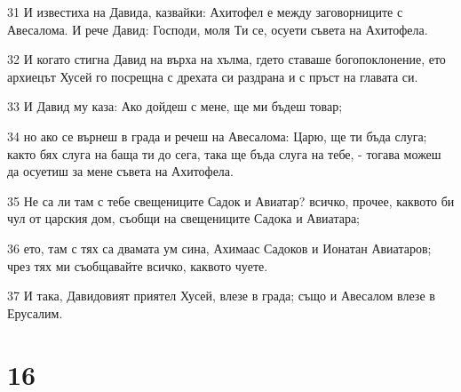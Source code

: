 \par 31 И известиха на Давида, казвайки: Ахитофел е между заговорниците с Авесалома. И рече Давид: Господи, моля Ти се, осуети съвета на Ахитофела.
\par 32 И когато стигна Давид на върха на хълма, гдето ставаше богопоклонение, ето архиецът Хусей го посрещна с дрехата си раздрана и с пръст на главата си.
\par 33 И Давид му каза: Ако дойдеш с мене, ще ми бъдеш товар;
\par 34 но ако се върнеш в града и речеш на Авесалома: Царю, ще ти бъда слуга; както бях слуга на баща ти до сега, така ще бъда слуга на тебе, - тогава можеш да осуетиш за мене съвета на Ахитофела.
\par 35 Не са ли там с тебе свещениците Садок и Авиатар? всичко, прочее, каквото би чул от царския дом, съобщи на свещениците Садока и Авиатара;
\par 36 ето, там с тях са двамата ум сина, Ахимаас Садоков и Ионатан Авиатаров; чрез тях ми съобщавайте всичко, каквото чуете.
\par 37 И така, Давидовият приятел Хусей, влезе в града; също и Авесалом влезе в Ерусалим.

\chapter{16}

